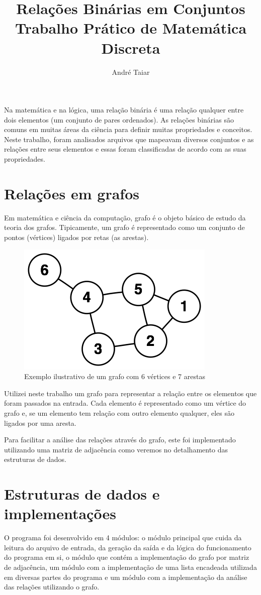 \documentclass[12pt]{article}
\title{Relações Binárias em Conjuntos\\Trabalho Prático de Matemática Discreta}
\author{André Taiar\inst{1}}
\begin{document}
\maketitle

\begin{resumo}
  Na matemática e na lógica, uma relação binária é uma relação qualquer entre
  dois elementos (um conjunto de pares ordenados). As relações binárias são comuns
  em muitas áreas da ciência para definir muitas propriedades e conceitos. Neste
  trabalho, foram analisados arquivos que mapeavam diversos conjuntos e as
  relações entre seus elementos e essas foram classificadas de acordo com as
  suas propriedades.
\end{resumo}


\section{Relações em grafos} %
Em matemática e ciência da computação, grafo é o objeto básico de estudo da
teoria dos grafos. Tipicamente, um grafo é representado como um conjunto de
pontos (vértices) ligados por retas (as arestas).

\begin{figure}[ht]
\centering
\includegraphics[width=.5\textwidth]{grafoEx.png}
\caption{Exemplo ilustrativo de um grafo com 6 vértices e 7 arestas}
\label{fig:exampleFig1}
\end{figure}

Utilizei neste trabalho um grafo para representar a relação entre os elementos
que foram passados na entrada. Cada elemento é representado como um vértice do
grafo e, se um elemento tem relação com outro elemento qualquer, eles são ligados
por uma aresta.

Para facilitar a análise das relações através do grafo, este foi implementado
utilizando uma matriz de adjacência como veremos no detalhamento das estruturas de
dados.

\section{Estruturas de dados e implementações}
O programa foi desenvolvido em 4 módulos: o módulo principal que cuida da leitura
do arquivo de entrada, da geração da saída e da lógica do funcionamento do programa
em si, o módulo que contém a implementação do grafo por matriz de adjacência, um
módulo com a implementação de uma lista encadeada utilizada em diversas partes
do programa e um módulo com a implementação da análise das relações utilizando o grafo.
\end{document}
